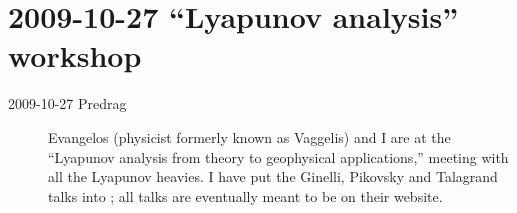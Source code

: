 \section{2009-10-27 ``Lyapunov analysis'' workshop}
\label{iscpif}

\begin{description}

\item[2009-10-27 Predrag] Evangelos (physicist formerly known
as Vaggelis) and I are at the ``Lyapunov analysis from theory
to geophysical applications,''
 meeting with
all the Lyapunov heavies. I have put the Ginelli, Pikovsky and
Talagrand talks into ; all talks are eventually
meant to be on their website.
\end{description}

